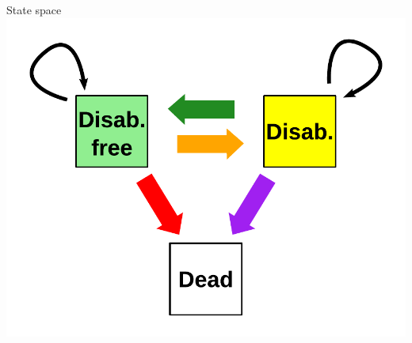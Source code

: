 \documentclass[20pt,usenames,dvipsnames]{beamer}
\begin{document}
\begin{frame}[plain]
\Large
\begin{center}
State space
\includegraphics[height=\textheight, keepaspectratio]{Figures/StateSpace.pdf}
\end{center}
\end{frame}
\end{document}
